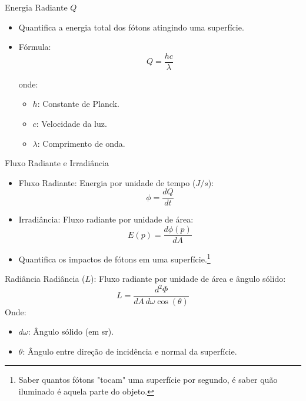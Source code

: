 \begin{frame}{Energia Radiante $Q$}
    \begin{itemize}
        \item Quantifica a energia total dos fótons atingindo uma superfície.
        \item Fórmula:
        \[
            Q = \frac{hc}{\lambda}
        \]

        onde:
        \begin{itemize}
            \item \( h \): Constante de Planck.  
            \item \( c \): Velocidade da luz.  
            \item \( \lambda \): Comprimento de onda.  
        \end{itemize}
    \end{itemize}
\end{frame}

\begin{frame}{Fluxo Radiante e Irradiância}
    \begin{itemize}
        \item Fluxo Radiante: Energia por unidade de tempo (\( J/s \)):
        \[
            \phi = \frac{dQ}{dt} %
        \]
        \item Irradiância: Fluxo radiante por unidade de área:
        \[
        E(p) = \frac{d\phi(p)}{dA} %
        \]
    \item Quantifica os impactos de fótons em uma superfície.\footnote{\footnotesize{Saber quantos fótons "tocam" uma superfície por segundo, é saber quão iluminado é aquela parte do objeto.}}
    \end{itemize}
\end{frame}

\begin{frame}{Radiância}
    Radiância (\( L \)): Fluxo radiante por unidade de área e ângulo sólido:
    \[
    L = \frac{d^2\Phi}{dA \, d\omega \cos(\theta)}
    \]
    Onde:
    \begin{itemize}
        \item \( d\omega \): Ângulo sólido (em sr).  
        \item \( \theta \): Ângulo entre direção de incidência e normal da superfície.
    \end{itemize}
\end{frame}



